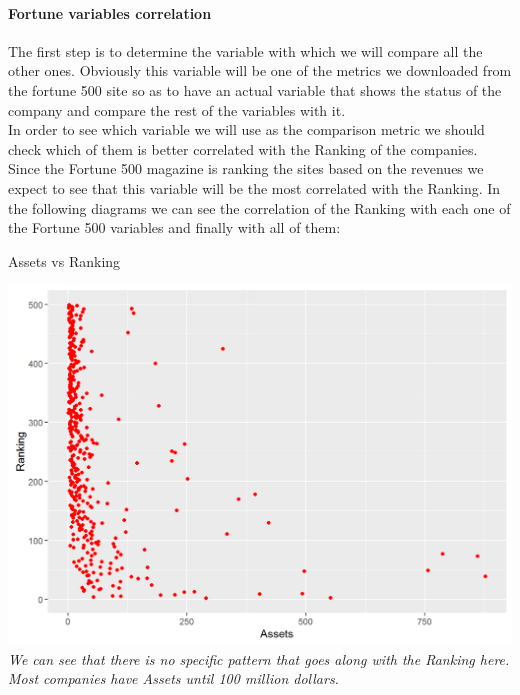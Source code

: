 \documentclass{article}
\begin{document}
\paragraph{Fortune variables correlation}
The first step is to determine the variable with which we will compare all the other ones. Obviously this variable will be one of the metrics we downloaded from the fortune 500 site so as to have an actual variable that shows the status of the company and compare the rest of the variables with it.\\
In order to see which variable we will use as the comparison metric we should check which of them is better correlated with the Ranking of the companies. Since the Fortune 500 magazine is ranking the sites based on the revenues we expect to see that this variable will be the most correlated with the Ranking. In the following diagrams we can see the correlation of the Ranking with each one of the Fortune 500 variables and finally with all of them:\\
\begin{table}[H]
\centering
\caption{Assets vs Ranking}
\begin{center}
\includegraphics[scale=0.5]{../R/photos/05_rank_assets.png}  \\
\textit{We can see that there is no specific pattern that goes along with the Ranking here. Most companies have Assets until 100 million dollars.}
\end{center}
\end{table}
\end{document}
